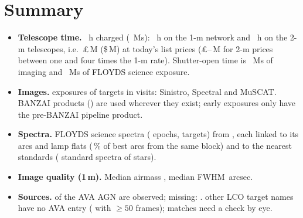 \chapter*{Summary}
\begin{itemize}\setlength{\itemsep}{2pt}
\item \textbf{Telescope time.} \hoursTotal{}~h charged (\msTotal~Ms): \hoursOneM~h on the 1-m network and
  \hoursTwoM~h on the 2-m telescopes, i.e.\ \pounds\gbpTotal\,M (\$\usdTotal\,M) at today's list prices
  (\pounds\gbpTotalLow--\gbpTotalHigh\,M for 2-m prices between one and four times the 1-m rate).
  Shutter-open time is \expImagesMs~Ms of imaging and \expSpectraMs~Ms of FLOYDS science exposure.
\item \textbf{Images.} \nImages{} exposures of \nImageTargets{} targets in \nVisits{} visits:
  \nImagesSinistro{} Sinistro, \nImagesSpectral{} Spectral and \nImagesMuscat{} MuSCAT. BANZAI products
  (\nImagesNinetyOne) are used wherever they exist; \nImagesNinety{} early exposures only have the
  pre-BANZAI pipeline product.
\item \textbf{Spectra.} \nSpectra{} FLOYDS science spectra (\nSpecEpochs{} epochs, \nSpecTargets{} targets) from
  \firstSpectrum, each linked to its arcs and lamp flats (\fracArcBlock\,\% of best arcs from the same block) and
  to the nearest standards (\nStdFrames{} standard spectra of \nStdTargets{} stars).
\item \textbf{Image quality (1\,m).} Median airmass \medAirmass, median FWHM \medFwhm\,arcsec.
\item \textbf{Sources.} \nAvaMatched{} of the \nAva{} AVA AGN are observed; missing: \avaMissing.
  \nNotInAva{} other LCO target names have no AVA entry (\nNotInAvaFifty{} with $\geq 50$ frames); \nAvaReview{}
  matches need a check by eye.
\end{itemize}
